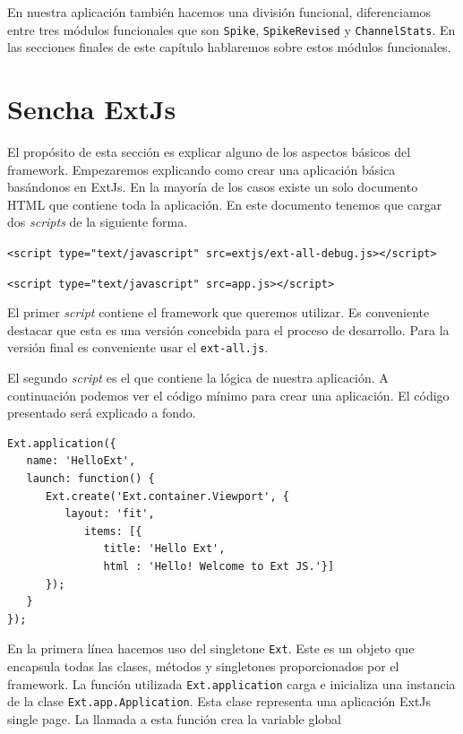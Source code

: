 \par
En nuestra aplicación también hacemos una división funcional, diferenciamos entre tres módulos funcionales que son \texttt{Spike},
\texttt{SpikeRevised} y \texttt{ChannelStats}. En las secciones finales de este capítulo hablaremos sobre estos módulos funcionales. 

\section{Sencha ExtJs}
	El propósito de esta sección es explicar alguno de los aspectos básicos del framework. Empezaremos explicando como crear una aplicación básica
	basándonos en ExtJs. En la mayoría de los casos existe un solo documento HTML\cite{HTML} que contiene toda la aplicación. En este documento
	tenemos que cargar dos \emph{scripts} de la siguiente forma.
    		\begin{center} \texttt{<script type="text/javascript" src=\textquotedbl extjs/ext-all-debug.js\textquotedbl ></script>}  \end{center}
    		\begin{center} \texttt{<script type="text/javascript" src=\textquotedbl app.js\textquotedbl ></script>}  \end{center}
	El primer \emph{script} contiene el framework que queremos utilizar. Es conveniente destacar que esta es una versión concebida para el proceso
	de desarrollo. Para la versión final es conveniente usar el \texttt{ext-all.js}.
 	\par
	El segundo \emph{script} es el que contiene la lógica de nuestra aplicación. A continuación podemos ver el código mínimo para crear una
	aplicación. El código presentado será explicado a fondo.
	\begin{lstlisting}[style=myJs]
Ext.application({
   name: 'HelloExt',
   launch: function() {
      Ext.create('Ext.container.Viewport', {
         layout: 'fit',
            items: [{
               title: 'Hello Ext',
               html : 'Hello! Welcome to Ext JS.'}] 
      }); 
   } 
});
	\end{lstlisting}
	\par
	En la primera línea hacemos uso del singletone \texttt{Ext}. Este es un objeto que encapsula todas las clases, métodos y singletones
	proporcionados por el framework. La función utilizada \texttt{Ext.application} carga e inicializa una instancia de la clase
	\texttt{Ext.app.Application}. Esta clase representa una aplicación ExtJs single page. La llamada a esta función crea la variable global
